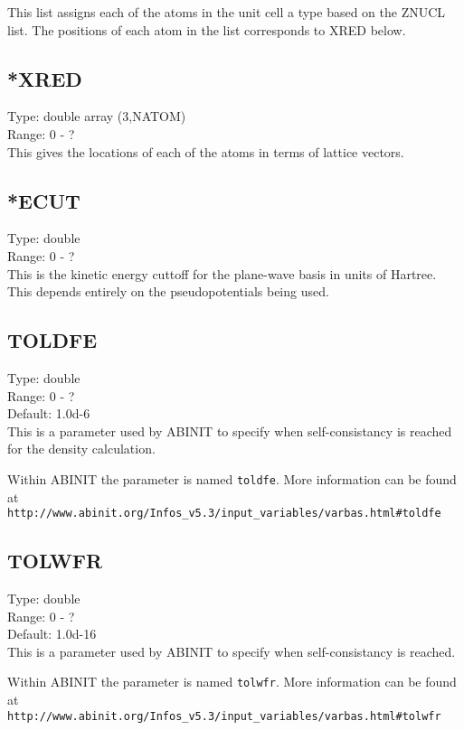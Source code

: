 \documentclass[12pt]{revtex4}
\begin{document}
This list assigns each of the atoms in the unit cell a type based on the ZNUCL list. The positions of each atom in the list corresponds to XRED below.

\subsection{*XRED}
Type: double array (3,NATOM) \\
Range: 0 - ? \\

This gives the locations of each of the atoms in terms of lattice vectors.

\subsection{*ECUT}
Type: double \\
Range: 0 - ? \\

This is the kinetic energy cuttoff for the plane-wave basis in units of Hartree. This depends entirely on
the pseudopotentials being used.

\subsection{TOLDFE}
Type: double \\
Range: 0 - ? \\
Default: 1.0d-6\\

This is a parameter used by \textsc{ABINIT} to specify when 
self-consistancy is reached for the density calculation.

Within \textsc{ABINIT} the parameter is named \verb|toldfe|.
More information can be found at 
\\
\verb|http://www.abinit.org/Infos_v5.3/input_variables/varbas.html#toldfe|

\subsection{TOLWFR}
Type: double \\
Range: 0 - ? \\
Default: 1.0d-16 \\

This is a parameter used by \textsc{ABINIT} to specify when 
self-consistancy is reached. 

Within \textsc{ABINIT} the parameter is named \verb|tolwfr|.
More information can be found at 
\\ 
\verb|http://www.abinit.org/Infos_v5.3/input_variables/varbas.html#tolwfr|
\end{document}
